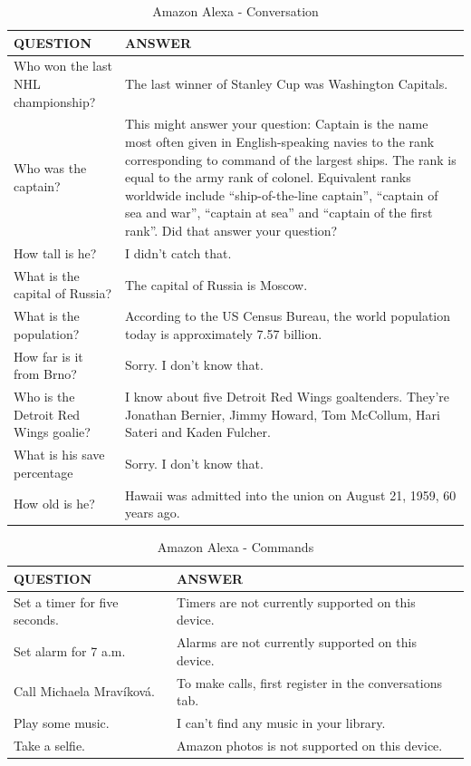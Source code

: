 \documentclass[
  digital, %
  oneside, %
  table,   %
  lof,     %
  lot,     %
]{fithesis3}
\begin{document}
\begin{table}[H]
    \begin{tabular}{ | p{6cm} | p{6cm} |} 
    \hline
    QUESTION & ANSWER \\
    \hline
    Who won the last NHL championship?
    & 
    The last winner of Stanley Cup was Washington Capitals.
    \\
    Who was the captain?
    &
    This might answer your question: Captain is the name most often given in English-speaking navies to the rank corresponding to command of the largest ships. The rank is equal to the army rank of colonel. Equivalent ranks worldwide include ``ship-of-the-line captain'', ``captain of sea and war'', ``captain at sea'' and ``captain of the first rank''. Did that answer your question?
    \\
    How tall is he?
    &
    I didn't catch that.
    \\
    \hline
    What is the capital of Russia?
    &
    The capital of Russia is Moscow.
    \\
    What is the population?
    &
    According to the US Census Bureau, the world population today is approximately 7.57 billion. 
    \\
    How far is it from Brno?
    & 
    Sorry. I don't know that.
    \\
    \hline
    Who is the Detroit Red Wings goalie?
    &
    I know about five Detroit Red Wings goaltenders. They're Jonathan Bernier, Jimmy Howard, Tom McCollum, Hari Sateri and Kaden Fulcher.
    \\
    What is his save percentage
    &
    Sorry. I don't know that.
    \\
    How old is he?
    & 
    Hawaii was admitted into the union on August 21, 1959, 60 years ago.
    \\
    \hline
    \end{tabular}
    \caption{Amazon Alexa - Conversation}
    \label{tab:alexa_conversation}
\end{table}

\begin{table}[H]
    \begin{tabular}{ | p{6cm} | p{6cm} |} 
    \hline
    QUESTION & ANSWER \\
    \hline
    Set a timer for five seconds.
    & 
    Timers are not currently supported on this device.
    \\
    \hline
    Set alarm for 7 a.m.
    &
    Alarms are not currently supported on this device.
    \\
    \hline
    Call Michaela Mravíková.
    &
    To make calls, first register in the conversations tab.
    \\
    \hline
    Play some music.
    &
    I can't find any music in your library.
    \\
    \hline
    Take a selfie.
    &
    Amazon photos is not supported on this device.
    \\
    \hline
    \end{tabular}
    \caption{Amazon Alexa - Commands}
    \label{tab:alexa_commands}
\end{table}
\end{document}
